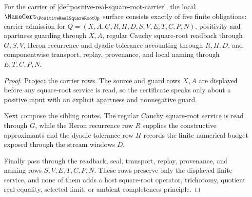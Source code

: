 \begin{theorem}
\label{thm:positive-real-square-root-namecert-obligations}
For the carrier of \autoref{def:positive-real-square-root-carrier}, the local $\NameCert_{\PositiveRealSquareRootUp}$ surface consists exactly of five finite obligations: carrier admission for $Q=(X,A,G,R,H,D,S,V,E,T,C,P,N)$, positivity and apartness guarding through $X,A$, regular Cauchy square-root readback through $G,S,V$, Heron recurrence and dyadic tolerance accounting through $R,H,D$, and componentwise transport, replay, provenance, and local naming through $E,T,C,P,N$.
\end{theorem}
\begin{proof}
Project the carrier rows. The source and guard rows $X,A$ are displayed before any square-root service is read, so the certificate speaks only about a positive input with an explicit apartness and nonnegative guard.

Next compose the sibling routes. The regular Cauchy square-root service is read through $G$, while the Heron recurrence row $R$ supplies the constructive approximants and the dyadic tolerance row $H$ records the finite numerical budget exposed through the stream windows $D$.

Finally pass through the readback, seal, transport, replay, provenance, and naming rows $S,V,E,T,C,P,N$. These rows preserve only the displayed finite service, and none of them adds a host square-root operator, trichotomy, quotient real equality, selected limit, or ambient completeness principle.
\end{proof}

